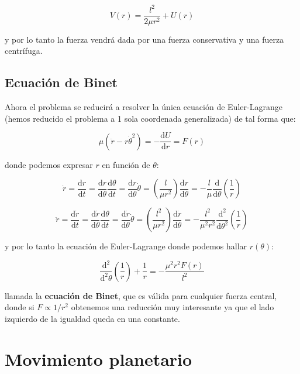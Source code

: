 \documentclass[12pt,a4paper]{book}
\newcommand{\parentesis}[1]{\left( #1  \right)}
\newcommand{\D}{\mathrm{d}}
\begin{document}
\begin{equation}
V(r) = \dfrac{l^2}{2 \mu r^2} + U(r)
\end{equation}

y por lo tanto la fuerza vendrá dada por una fuerza conservativa y una fuerza centrífuga.

\subsection{Ecuación de Binet}

Ahora el problema se reducirá a resolver la única ecuación de Euler-Lagrange (hemos reducido el problema a 1 sola coordenada generalizada) de tal forma que:

\begin{equation}
\mu (\ddot{r} - r \dot{\theta}^2) = - \dfrac{\D U}{\D r} = F(r)
\end{equation}

donde podemos expresar $r$ en función de $\theta$:

\begin{equation}
\dot{r} = \dfrac{\D r}{\D t} = \dfrac{\D r}{\D \theta} \dfrac{\D \theta}{\D t} = \dfrac{\D r}{\D \theta} \dot{\theta} = \parentesis{\dfrac{l}{ \mu r^2}} \dfrac{\D r}{\D \theta} = - \dfrac{l}{\mu} \dfrac{\D}{\D \theta} \parentesis{\dfrac{1}{r}}
\end{equation}


\begin{equation}
\ddot{r} = \dfrac{\D \dot{r}}{\D t} = \dfrac{\D \dot{r}}{\D \theta} \dfrac{\D \theta}{\D t} = \dfrac{\D \dot{r}}{\D \theta} \dot{\theta} = \parentesis{\dfrac{l^2}{ \mu r^2}} \dfrac{\D \dot{r}}{\D \theta} = - \dfrac{l^2}{\mu^2 r^2} \dfrac{\D^2}{\D \theta^2} \parentesis{\dfrac{1}{r}}
\end{equation}


y por lo tanto la ecuación de Euler-Lagrange donde podemos hallar $r(\theta)$:

\begin{equation}
\dfrac{\D^2}{\D^2 \theta} \parentesis{\dfrac{1}{r}} + \dfrac{1}{r} = - \dfrac{\mu^2 r^2 F(r)}{l^2}
\end{equation}

llamada la \textbf{ecuación de Binet}, que es válida para cualquier fuerza central, donde si $F \propto 1/r^2$ obtenemos una reducción muy interesante ya que el lado izquierdo de la igualdad queda en una constante.

\section{Movimiento planetario}
\end{document}
